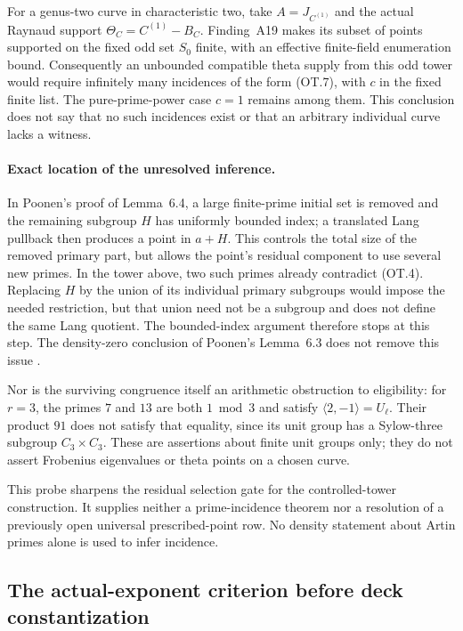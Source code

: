 \documentclass[11pt,a4paper]{article}
\begin{document}
For a genus-two curve in characteristic two, take
$A=J_{C^{(1)}}$ and the actual Raynaud support
$\Theta_C=C^{(1)}-B_C$.  Finding~A19 makes its subset of points
supported on the fixed odd set $S_0$ finite, with an effective
finite-field enumeration bound.  Consequently an unbounded
compatible theta supply from this odd tower would require
infinitely many incidences of the form (OT.7), with $c$ in the
fixed finite list.  The pure-prime-power case $c=1$ remains among
them.  This conclusion does not say that no such incidences
exist or that an arbitrary individual curve lacks a witness.

\paragraph{Exact location of the unresolved inference.}
In Poonen's proof of Lemma~6.4, a large finite-prime initial set
is removed and the remaining subgroup $H$ has uniformly bounded
index; a translated Lang pullback then produces a point in
$a+H$.  This controls the total size of the removed primary
part, but allows the point's residual component to use several
new primes.  In the tower above, two such primes already
contradict (OT.4).  Replacing $H$ by the union of its individual
primary subgroups would impose the needed restriction, but
that union need not be a subgroup and does not define the same
Lang quotient.  The bounded-index argument therefore stops at
this step.  The density-zero conclusion of Poonen's
Lemma~6.3 does not remove this issue
\cite[Lemmas~6.3--6.6]{Poonen2005}.

Nor is the surviving congruence itself an arithmetic obstruction
to eligibility: for $r=3$, the primes $7$ and $13$ are both
$1\bmod3$ and satisfy $\langle2,-1\rangle=U_\ell$.
Their product $91$ does not satisfy that equality, since its
unit group has a Sylow-three subgroup $C_3\times C_3$.
These are assertions about finite unit groups only; they do not
assert Frobenius eigenvalues or theta points on a chosen curve.

This probe sharpens the residual selection gate for the
controlled-tower construction.  It supplies neither a
prime-incidence theorem nor a resolution of a previously open
universal prescribed-point row.  No density statement about
Artin primes alone is used to infer incidence.


\subsection{The actual-exponent criterion before deck constantization}
\label{sec:nonconstant-deck-exponent}
\end{document}
